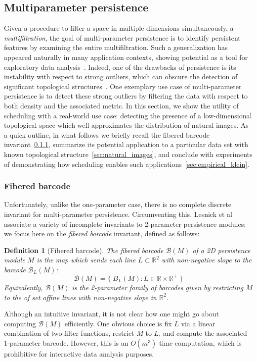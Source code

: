 \documentclass[sn-mathphys]{sn-jnl}
\newtheorem{definition}{Definition}
\begin{document}
\subsection{Multiparameter persistence}
Given a procedure to filter a space in multiple dimensions simultaneously, a \emph{multifiltration}, the goal of multi-parameter persistence is to identify persistent features by examining the entire multifiltration. 
Such a generalization has appeared naturally in many application contexts, showing potential as a tool for exploratory data analysis~\cite{lesnick2012multidimensional}. Indeed, one of the drawbacks of persistence is its instability with respect to strong outliers, which can obscure the detection of significant topological structures~\cite{buchet2015topological}.
One exemplary use case of multi-parameter persistence is to detect these strong outliers by filtering the data with respect to both density and the associated metric.
In this section, we show the utility of scheduling with a real-world use case: detecting the presence of a low-dimensional topological space which well-approximates the distribution of natural images. 
As a quick outline, in what follows we briefly recall the fibered barcode invariant~\ref{sec:fibered_barcode}, summarize its potential application to a particular data set with known topological structure~\ref{sec:natural_images}, and conclude with experiments of demonstrating how scheduling enables such applications~\ref{sec:empirical_klein}.   

\subsubsection{Fibered barcode}\label{sec:fibered_barcode}
Unfortunately, unlike the one-parameter case, there is no complete discrete invariant for multi-parameter persistence.
Circumventing this, Lesnick et al~\cite{lesnick2015interactive} associate a variety of incomplete invariants to 2-parameter persistence modules; we focus here on the \emph{fibered barcode} invariant, defined as follows: 
\begin{definition}[Fibered barcode]
	The fibered barcode $\mathcal{B}(M)$ of a 2D persistence module $M$ is the map which sends each line  $L \subset \mathbb{R}^2$ with non-negative slope to the barcode $\mathcal{B}_L(M)$: 
$$ \mathcal{B}(M) = \{ \; B_L(M) : L \in \mathbb{R} \times \mathbb{R}^{+} \; \}$$
Equivalently, $\mathcal{B}(M)$ is the 2-parameter family of barcodes given by restricting $M$ to the of set affine lines with non-negative slope in $\mathbb{R}^2$. 
\end{definition} 
\noindent Although an intuitive invariant, it is not clear how one might go about computing $\mathcal{B}(M)$ efficiently. 
One obvious choice is fix $L$ via a linear combination of two filter functions, restrict $M$ to $L$, and compute the associated 1-parameter barcode. 
However, this is an $O(m^3)$ time computation, which is prohibitive for interactive data analysis purposes. 
\end{document}
